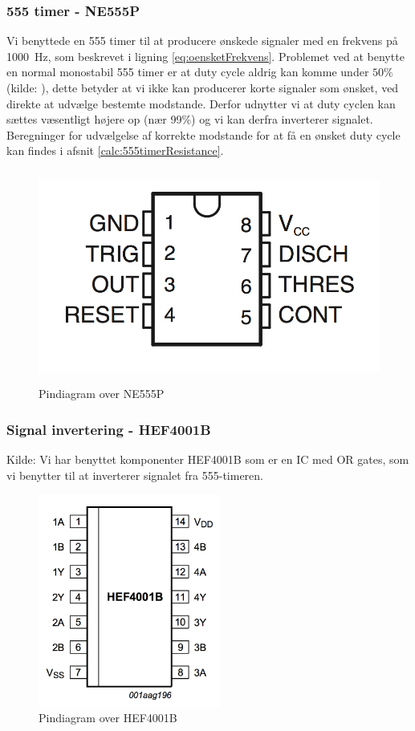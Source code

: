\subsubsection{555 timer - NE555P}
Vi benyttede en 555 timer\cite{komp555} til at producere ønskede signaler med en frekvens på \SI{1000}{Hz}, som beskrevet i ligning \ref{eq:oensketFrekvens}.
Problemet ved at benytte en normal monostabil 555 timer er at duty cycle aldrig kan komme under $50\%$ (kilde: \cite{555timer50percent}), dette betyder at vi ikke kan producerer korte signaler som ønsket, ved direkte at udvælge bestemte modstande. Derfor udnytter vi at duty cyclen kan sættes væsentligt højere op (nær 99\%) og vi kan derfra inverterer signalet. Beregninger for udvælgelse af korrekte modstande for at få en ønsket duty cycle kan findes i afsnit \ref{calc:555timerResistance}.

\begin{figure}[H]
	\centering
    \includegraphics[height=7cm]{figures/2_4_4hastighedsmaal/komp555pin.png}
	\caption{Pindiagram over NE555P}
	\label{fig:komp555pin}
\end{figure}

\subsubsection{Signal invertering - HEF4001B}
Kilde: \cite{kompInverter}
Vi har benyttet komponenter HEF4001B som er en IC med OR gates, som vi benytter til at inverterer signalet fra 555-timeren.



\begin{figure}[H]
	\centering
    \includegraphics[height=7cm]{figures/2_4_4hastighedsmaal/kompInverterpin.png}
	\caption{Pindiagram over HEF4001B}
	\label{fig:kompInverter}
\end{figure}


